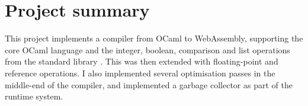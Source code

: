 \section{Project summary}
This project implements a compiler from OCaml to WebAssembly, supporting the core OCaml language and the integer, boolean, comparison and list operations from the standard library \cite{stdlib}. This was then extended with floating-point and reference operations.  I also implemented several optimisation passes in the middle-end of the compiler, and implemented a garbage collector as part of the runtime system.








